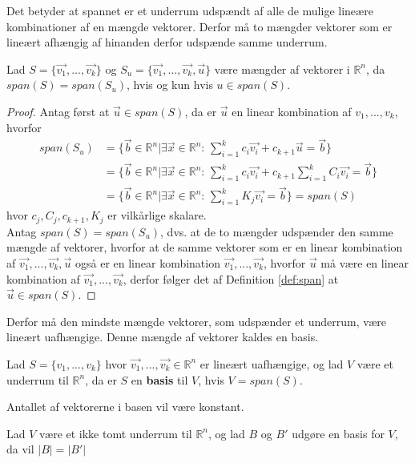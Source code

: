 Det betyder at spannet er et underrum udspændt af alle de mulige lineære kombinationer af en mængde vektorer. 
Derfor må to mængder vektorer som er lineært afhængig af hinanden derfor udspænde samme underrum.
\begin{stn}
Lad $S = \{\vec{v_1},...,\vec{v_k}\}$ og $S_u = \{\vec{v_1},...,\vec{v_k}, \vec{u}\}$ være mængder af vektorer i $\mathds{R}^n$, da $span(S) = span(S_u)$, hvis og kun hvis $u \in span(S)$.
\label{stn:akvivalentespan}
\end{stn}
\begin{proof}
Antag først at $\vec{u} \in span(S)$, da er $\vec{u}$ en linear kombination af $v_1,..., v_k$, hvorfor
\begin{align*}
span(S_u) &= \{ \vec{b} \in \mathds{R}^n| \exists \vec{x} \in \mathds{R}^n: \, \sum_{i=1}^k c_i \vec{v_i} + c_{k+1} \vec{u}  =\vec{b}\}
\\&= \{ \vec{b} \in \mathds{R}^n| \exists \vec{x} \in \mathds{R}^n: \, \sum_{i=1}^k c_i \vec{v_i} + c_{k+1} \sum_{i=1}^k C_i \vec{v_i} = \vec{b}\}
\\&= \{ \vec{b} \in \mathds{R}^n| \exists \vec{x} \in \mathds{R}^n: \, \sum_{i=1}^k K_j \vec{v_i} = \vec{b}\} = span(S)
\end{align*}
hvor $c_j, C_j, c_{k+1}, K_j$ er vilkårlige skalare.
\\ Antag $span(S) = span(S_u)$, dvs. at de to mængder udspænder den samme mængde af vektorer, hvorfor at de samme vektorer som er en linear kombination af $\vec{v_1},...,\vec{v_k}, \vec{u}$ også er en linear kombination $\vec{v_1},..., \vec{v_k}$, hvorfor $\vec{u}$ må være en linear kombination af  $\vec{v_1},..., \vec{v_k}$, derfor følger det af Definition \ref{def:span} at $\vec{u} \in span(S)$.
\end{proof}
Derfor må den mindste mængde vektorer, som udspænder et underrum, være lineært uafhængige.
Denne mængde af vektorer kaldes en basis.
\begin{defn}[Basis]
Lad $S =\{v_1,...,v_k\}$ hvor $\vec{v_1},...,\vec{v_k} \in \mathds{R}^n$ er lineært uafhængige, og lad $V$ være et underrum til $\mathds{R}^n$, da er $S$ en \textbf{basis} til $V$, hvis $V = span(S)$.
\label{def:basis}
\end{defn}
Antallet af vektorerne i basen vil være konstant.
\begin{stn}
Lad $V$ være et ikke tomt underrum til $\mathds{R}^n$, og lad $B$ og $B'$ udgøre en basis for $V$, da vil $|B|=|B'|$
\label{stn:basiskardinalitet}
\end{stn}

